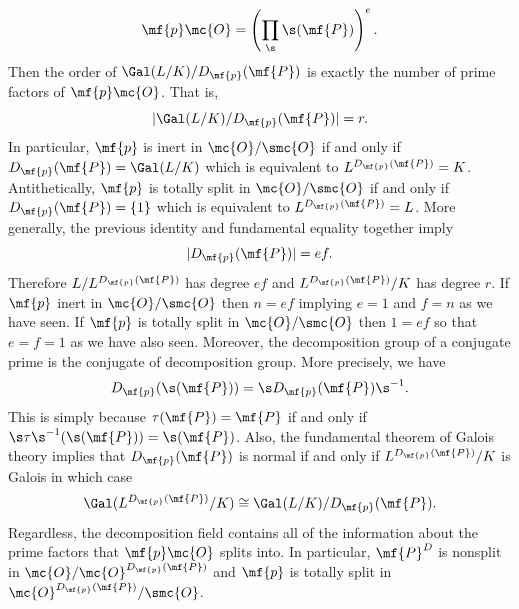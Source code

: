 \documentclass[12pt]{article}
\begin{document}
      \[
        \mf{p}\mc{O} = \left(\prod_{\s}\s(\mf{P})\right)^{e}.
      \]
      Then the order of \(\Gal(L/K)/D_{\mf{p}}(\mf{P})\) is exactly the number of prime factors of \(\mf{p}\mc{O}\). That is,
      \[
        |\Gal(L/K)/D_{\mf{p}}(\mf{P})| = r.
      \]
      In particular, \(\mf{p}\) is inert in \(\mc{O}/\smc{O}\) if and only if \(D_{\mf{p}}(\mf{P}) = \Gal(L/K)\) which is equivalent to \(L^{D_{\mf{p}}(\mf{P})} = K\). Antithetically, \(\mf{p}\) is totally split in \(\mc{O}/\smc{O}\) if and only if \(D_{\mf{p}}(\mf{P}) = \{1\}\) which is equivalent to \(L^{D_{\mf{p}}(\mf{P})} = L\). More generally, the previous identity and fundamental equality together imply
      \begin{equation}\label{equ:decomposition_group_e_f_relation}
        |D_{\mf{p}}(\mf{P})| = ef.
      \end{equation}
      Therefore \(L/L^{D_{\mf{p}}(\mf{P})}\) has degree \(ef\) and \(L^{D_{\mf{p}}(\mf{P})}/K\) has degree \(r\). If \(\mf{p}\) inert in \(\mc{O}/\smc{O}\) then \(n = ef\) implying \(e = 1\) and \(f = n\) as we have seen. If \(\mf{p}\) is totally split in \(\mc{O}/\smc{O}\) then \(1 = ef\) so that \(e = f = 1\) as we have also seen. Moreover, the decomposition group of a conjugate prime is the conjugate of decomposition group. More precisely, we have
      \[
        D_{\mf{p}}(\s(\mf{P})) = \s D_{\mf{p}}(\mf{P})\s^{-1}.
      \]
      This is simply because \(\tau(\mf{P}) = \mf{P}\) if and only if \(\s\tau\s^{-1}(\s(\mf{P})) = \s(\mf{P})\). Also, the fundamental theorem of Galois theory implies that \(D_{\mf{p}}(\mf{P})\) is normal if and only if \(L^{D_{\mf{p}}(\mf{P})}/K\) is Galois in which case
      \[
        \Gal(L^{D_{\mf{p}}(\mf{P})}/K) \cong \Gal(L/K)/D_{\mf{p}}(\mf{P}).
      \]
      Regardless, the decomposition field contains all of the information about the prime factors that \(\mf{p}\mc{O}\) splits into. In particular, \(\mf{P}^{D}\) is nonsplit in \(\mc{O}/\mc{O}^{D_{\mf{p}}(\mf{P})}\) and \(\mf{p}\) is totally split in \(\mc{O}^{D_{\mf{p}}(\mf{P})}/\smc{O}\).
\end{document}
